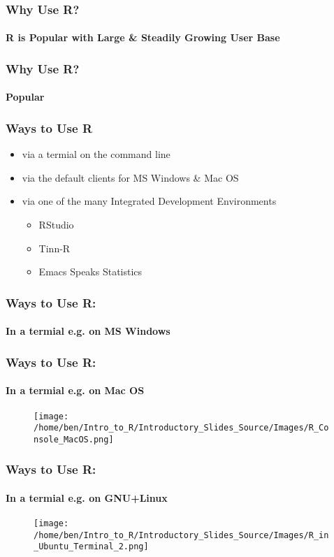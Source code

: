 \documentclass[xcolor=dvipsnames]{beamer}
\begin{document}
\begin{frame} 
\frametitle{Why Use R?}
\framesubtitle{R is Popular with Large \& Steadily Growing User Base}


\end{frame}


\begin{frame} 
\frametitle{Why Use R?}
\framesubtitle{Popular}
\end{frame}



\begin{frame} 
\frametitle{Ways to Use R}
\begin{itemize}
\item via a termial on the command line
\item via the default clients for MS Windows \& Mac OS
\item via one of the many Integrated Development Environments \begin{itemize}
 \item RStudio
 \item Tinn-R
 \item Emacs Speaks Statistics \end{itemize}
\end{itemize}
\end{frame}

\begin{frame}
\frametitle{Ways to Use R:}
\framesubtitle{In a termial e.g. on MS Windows}
\end{frame}

\begin{frame}
\frametitle{Ways to Use R:}
\framesubtitle{In a termial e.g. on Mac OS}
\begin{figure}
\texttt{[image: /home/ben/Intro\_to\_R/Introductory\_Slides\_Source/Images/R\_Console\_MacOS.png]}
\end{figure}
\end{frame}

\begin{frame}
\frametitle{Ways to Use R:}
\framesubtitle{In a termial e.g. on GNU+Linux}
\begin{figure}
\texttt{[image: /home/ben/Intro\_to\_R/Introductory\_Slides\_Source/Images/R\_in\_Ubuntu\_Terminal\_2.png]}
\end{figure}
\end{frame}
\end{document}
